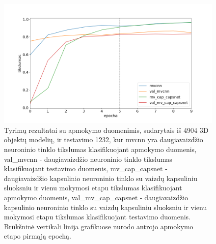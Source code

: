 \begin{figure}[H]
	\centering
	\includegraphics[scale=0.5]{img/less_data_v1.png}
	\caption{
		Tyrimų rezultatai su apmokymo duomenimis, sudarytais iš 4904 3D objektų modelių, ir testavimo 1232, kur mvcnn yra daugiavaizdžio neuroninio tinklo tikslumas klasifikuojant apmokymo duomenis, val\_mvcnn - daugiavaizdžio neuroninio tinklo tikslumas klasifikuojant testavimo duomenis, mv\_cap\_capsnet - daugiavaizdžio kapsulinio neuroninio tinklo su vaizdų kapsuliniu sluoksniu ir vienu mokymosi etapu tikslumas klasifikuojant apmokymo duomenis, val\_mv\_cap\_capsnet - daugiavaizdžio kapsulinio neuroninio tinklo su vaizdų kapsuliniu sluoksniu ir vienu mokymosi etapu tikslumas klasifikuojant testavimo duomenis.	Brūkšninė vertikali linija grafikuose nurodo antrojo apmokymo etapo pirmąją epochą.
	}
	\label{img:less_datav1}
\end{figure}

